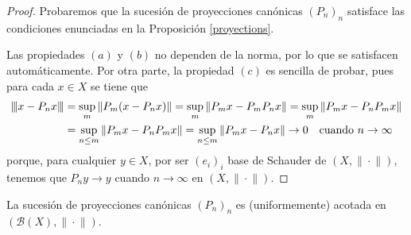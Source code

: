 		\begin{proof}
			Probaremos que la sucesión de proyecciones canónicas $(P_n)_n$ satisface las condiciones enunciadas en la Proposición \ref{proyections}.
			
			Las propiedades $(a)$ y $(b)$ no dependen de la norma, por lo que se satisfacen automáticamente. Por otra parte, la propiedad $(c)$ es sencilla de probar, pues para cada $x\in X$ se tiene que
			\begin{align*}\label{eq:unicidad}  
				{\left\vert\kern-0.25ex\left\vert\kern-0.25ex\left\vert x-P_nx \right\vert\kern-0.25ex\right\vert\kern-0.25ex\right\vert} &=\sup_{m}{\|P_m(x-P_nx)\|}=\sup_{m}{\|P_mx-P_mP_nx\|}=\sup_{m}{\|P_mx - P_nP_mx\|}\\&=\sup_{n\leq m}{\|P_mx - P_nP_mx\|}=\sup_{n\leq m}{\|P_mx - P_nx\|}\to 0\quad\text{cuando $n\to\infty$}  
			\end{align*}
			porque, para cualquier $y\in X$, por ser $(e_i)_i$ base de Schauder de $(X,\|\!\cdot\!\|)$, tenemos que $P_ny \to y$ cuando $n\to\infty$ en $(X,\|\!\cdot\!\|)$.
		\end{proof}
	
	
	\begin{theorem}\label{th:banach}
		La sucesión de proyecciones canónicas $(P_n)_n$ es (uniformemente) acotada en $(\mathcal{B}(X),\|\!\cdot\!\|)$.
		
	\end{theorem}
	

